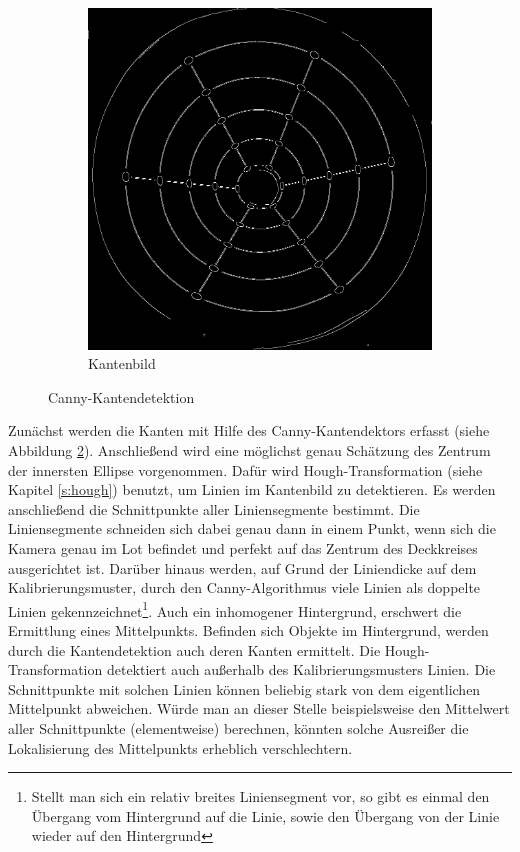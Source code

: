 \begin{figure}[!htb]
\begin{subfigure}{.5\textwidth}
		\includegraphics[width=.9\textwidth]{images/canny.png}
		\caption{Kantenbild}
		\label{fig:afterCanny}
	\end{subfigure}
	\caption{Canny-Kantendetektion}
	\label{fig:canny}
\end{figure}

Zunächst werden die Kanten mit Hilfe des Canny-Kantendektors \cite{Canny1986} erfasst (siehe Abbildung \ref{fig:canny}).
Anschließend wird eine möglichst genau Schätzung des Zentrum der innersten Ellipse vorgenommen.
Dafür wird Hough-Transformation (siehe Kapitel \ref{s:hough}) benutzt, um Linien im Kantenbild zu detektieren.
Es werden anschließend die Schnittpunkte aller Liniensegmente bestimmt.
Die Liniensegmente schneiden sich dabei genau dann in einem Punkt, wenn sich die Kamera genau im Lot befindet und perfekt auf das Zentrum des Deckkreises ausgerichtet ist.
Darüber hinaus werden, auf Grund der Liniendicke auf dem Kalibrierungsmuster, durch den Canny-Algorithmus viele Linien als doppelte Linien gekennzeichnet\footnote{Stellt man sich ein relativ breites Liniensegment vor, so gibt es einmal den Übergang vom Hintergrund auf die Linie, sowie den Übergang von der Linie wieder auf den Hintergrund}. Auch ein inhomogener Hintergrund, erschwert die Ermittlung eines Mittelpunkts. Befinden sich Objekte im Hintergrund, werden durch die Kantendetektion auch deren Kanten ermittelt. Die Hough-Transformation detektiert auch außerhalb des Kalibrierungsmusters Linien. Die Schnittpunkte mit solchen Linien können beliebig stark von dem eigentlichen Mittelpunkt abweichen. Würde man an dieser Stelle beispielsweise den Mittelwert aller Schnittpunkte (elementweise) berechnen, könnten solche Ausreißer die Lokalisierung des Mittelpunkts erheblich verschlechtern.

